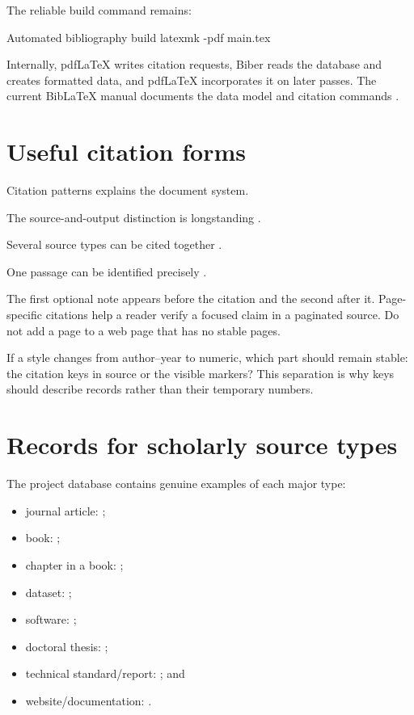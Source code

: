 The reliable build command remains:

\begin{terminalcode}{Automated bibliography build}
latexmk -pdf main.tex
\end{terminalcode}

Internally, pdf\LaTeX{} writes citation requests, Biber reads the database and
creates formatted data, and pdf\LaTeX{} incorporates it on later passes. The
current Bib\LaTeX{} manual documents the data model and citation commands
\parencite{biblatexManual}.

\section{Useful citation forms}

\begin{latexcode}{Citation patterns}
\textcite{lamport1994} explains the document system.

The source-and-output distinction is longstanding
\parencite{lamport1994}.

Several source types can be cited together
\parencite{knuth1984,fisherIris}.

One passage can be identified precisely
\parencite[see][pp. 97--99]{knuth1984}.
\end{latexcode}

The first optional note appears before the citation and the second after it.
Page-specific citations help a reader verify a focused claim in a paginated
source. Do not add a page to a web page that has no stable pages.

\begin{pausepredict}
If a style changes from author--year to numeric, which part should remain
stable: the citation keys in source or the visible markers? This separation is
why keys should describe records rather than their temporary numbers.
\end{pausepredict}

\section{Records for scholarly source types}

The project database contains genuine examples of each major type:

\begin{itemize}
  \item journal article: \textcite{knuth1984};
  \item book: \textcite{lamport1994};
  \item chapter in a book: \textcite{chiroma2023};
  \item dataset: \textcite{fisherIris};
  \item software: \textcite{rproject};
  \item doctoral thesis: \textcite{heffernan2020};
  \item technical standard/report: \textcite{iso5725}; and
  \item website/documentation: \textcite{latexprojectDocumentation}.
\end{itemize}

